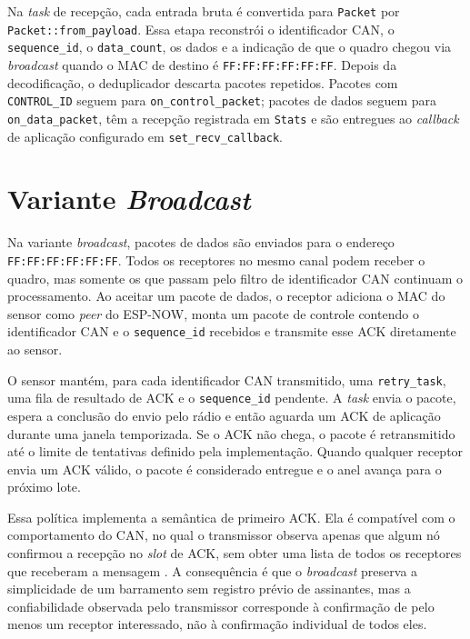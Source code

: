 Na \emph{task} de recepção, cada entrada bruta é convertida para \texttt{Packet} por
\texttt{Packet::from\_payload}. Essa etapa reconstrói o identificador CAN, o
\texttt{sequence\_id}, o \texttt{data\_count}, os dados e a indicação de que o
quadro chegou via \emph{broadcast} quando o MAC de destino é
\texttt{FF:FF:FF:FF:FF:FF}. Depois da decodificação, o deduplicador descarta
pacotes repetidos. Pacotes com \texttt{CONTROL\_ID} seguem para
\texttt{on\_control\_packet}; pacotes de dados seguem para
\texttt{on\_data\_packet}, têm a recepção registrada em \texttt{Stats} e são
entregues ao \emph{callback} de aplicação configurado em \texttt{set\_recv\_callback}.

\section{Variante \emph{Broadcast}}

Na variante \emph{broadcast}, pacotes de dados são enviados para o endereço
\texttt{FF:FF:FF:FF:FF:FF}. Todos os receptores no mesmo canal podem receber o
quadro, mas somente os que passam pelo filtro de identificador CAN continuam o processamento.
Ao aceitar um pacote de dados, o receptor adiciona o MAC do sensor como \emph{peer} do
ESP-NOW, monta um pacote de controle contendo o identificador CAN e o
\texttt{sequence\_id} recebidos e transmite esse ACK diretamente ao sensor.

O sensor mantém, para cada identificador CAN transmitido, uma \texttt{retry\_task}, uma fila
de resultado de ACK e o \texttt{sequence\_id} pendente. A \emph{task} envia o pacote,
espera a conclusão do envio pelo rádio e então aguarda um ACK de aplicação durante
uma janela temporizada. Se o ACK não chega, o pacote é retransmitido até o limite
de tentativas definido pela implementação. Quando qualquer receptor envia um ACK
válido, o pacote é considerado entregue e o anel avança para o próximo lote.

Essa política implementa a semântica de primeiro ACK. Ela é compatível com o
comportamento do CAN, no qual o transmissor observa apenas que algum nó confirmou
a recepção no \emph{slot} de ACK, sem obter uma lista de todos os receptores que
receberam a mensagem \cite{iso11898_1_2024}. A consequência é que o \emph{broadcast}
preserva a simplicidade de um barramento sem registro prévio de assinantes, mas a
confiabilidade observada pelo transmissor corresponde à confirmação de pelo menos
um receptor interessado, não à confirmação individual de todos eles.

